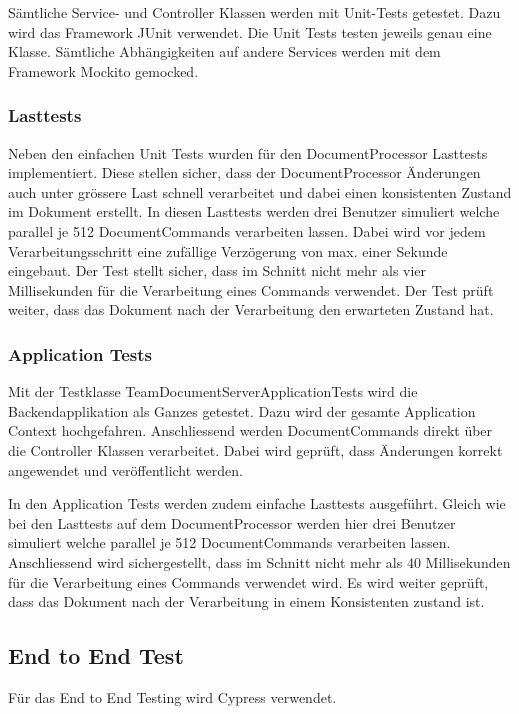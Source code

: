 Sämtliche Service- und Controller Klassen werden mit Unit-Tests getestet.
Dazu wird das Framework JUnit verwendet.
Die Unit Tests testen jeweils genau eine Klasse.
Sämtliche Abhängigkeiten auf andere Services werden mit dem Framework Mockito gemocked.

\subsubsection{Lasttests}

Neben den einfachen Unit Tests wurden für den DocumentProcessor Lasttests implementiert.
Diese stellen sicher, dass der DocumentProcessor Änderungen auch unter grössere Last schnell verarbeitet und dabei einen konsistenten Zustand im Dokument erstellt.
In diesen Lasttests werden drei Benutzer simuliert welche parallel je 512 DocumentCommands verarbeiten lassen.
Dabei wird vor jedem Verarbeitungsschritt eine zufällige Verzögerung von max. einer Sekunde eingebaut.
Der Test stellt sicher, dass im Schnitt nicht mehr als vier Millisekunden für die Verarbeitung eines Commands verwendet.
Der Test prüft weiter, dass das Dokument nach der Verarbeitung den erwarteten Zustand hat.

\subsubsection{Application Tests}

Mit der Testklasse TeamDocumentServerApplicationTests wird die Backendapplikation als Ganzes getestet.
Dazu wird der gesamte Application Context hochgefahren.
Anschliessend werden DocumentCommands direkt über die Controller Klassen verarbeitet.
Dabei wird geprüft, dass Änderungen korrekt angewendet und veröffentlicht werden.

In den Application Tests werden zudem einfache Lasttests ausgeführt.
Gleich wie bei den Lasttests auf dem DocumentProcessor werden hier drei Benutzer simuliert welche parallel je 512 DocumentCommands verarbeiten lassen.
Anschliessend wird sichergestellt, dass im Schnitt nicht mehr als 40 Millisekunden für die Verarbeitung eines Commands verwendet wird.
Es wird weiter geprüft, dass das Dokument nach der Verarbeitung in einem Konsistenten zustand ist.



\subsection{End to End Test}
F\"ur das End to End Testing wird Cypress verwendet.

